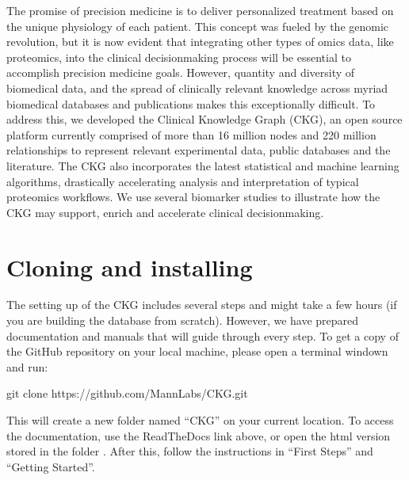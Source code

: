 \documentclass[letterpaper,10pt,english]{sphinxmanual}
\begin{document}

The promise of precision medicine is to deliver personalized treatment based on the unique physiology of each patient. This concept was fueled by the genomic revolution, but it is now evident that integrating other types of omics data, like proteomics, into the clinical decision\sphinxhyphen{}making process will be essential to accomplish precision medicine goals. However, quantity and diversity of biomedical data, and the spread of clinically relevant knowledge across myriad biomedical databases and publications makes this exceptionally difficult. To address this, we developed the Clinical Knowledge Graph (CKG), an open source platform currently comprised of more than 16 million nodes and 220 million relationships to represent relevant experimental data, public databases and the literature. The CKG also incorporates the latest statistical and machine learning algorithms, drastically accelerating analysis and interpretation of typical proteomics workflows. We use several biomarker studies to illustrate how the CKG may support, enrich and accelerate clinical decision\sphinxhyphen{}making.


\section{Cloning and installing}
\label{\detokenize{INTRO:cloning-and-installing}}
The setting up of the CKG includes several steps and might take a few hours (if you are building the database from scratch). However, we have prepared documentation and manuals that will guide through every step.
To get a copy of the GitHub repository on your local machine, please open a terminal windown and run:

\begin{sphinxVerbatim}[commandchars=\\\{\}]
\PYGZdl{} git clone https://github.com/MannLabs/CKG.git
\end{sphinxVerbatim}

This will create a new folder named “CKG” on your current location. To access the documentation, use the ReadTheDocs link above, or open the html version stored in the  folder . After this, follow the instructions in “First Steps” and “Getting Started”.
\end{document}
